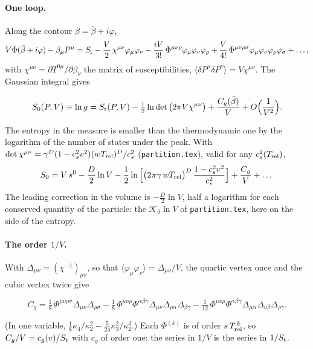 \documentclass[11pt,aps,preprint,nofootinbib,superscriptaddress,tightenlines]{revtex4-2}
\newcommand{\avg}[1]{\langle #1\rangle}
\def\st{\begin{equation}}
\def\stp{\end{equation}}
\let\oldparagraph\paragraph
\renewcommand{\paragraph}{\par\bigskip\oldparagraph}
\begin{document}
\paragraph{One loop.}  Along the contour $\beta=\bar\beta+i\varphi$,
\st
V\Phi(\bar\beta+i\varphi)-\beta_\mu P^\mu=S_{\rm t}-\frac V2\,\chi^{\mu\nu}\varphi_\mu\varphi_\nu
-\frac{iV}{3!}\,\Phi^{\mu\nu\rho}\varphi_\mu\varphi_\nu\varphi_\rho+\frac V{4!}\,\Phi^{\mu\nu\rho\sigma}\varphi_\mu\varphi_\nu\varphi_\rho\varphi_\sigma+\dots,
\stp
with $\chi^{\mu\nu}=\partial T^{0\mu}/\partial\beta_\nu$ the matrix of susceptibilities, $\avg{\delta P^\mu\delta P^\nu}=V\chi^{\mu\nu}$.  The Gaussian
integral gives
\begin{keyeq}
\st
S_0(P,V)\equiv\ln g=S_{\rm t}(P,V)-\tfrac12\ln\det\big(2\pi V\chi^{\mu\nu}\big)+\frac{C_g(\bar\beta)}V+O\Big(\frac1{V^2}\Big) .
\label{S0saddle}
\stp
\end{keyeq}
The entropy in the measure is smaller than the thermodynamic one by the logarithm of the number of states under the peak.  With
$\det\chi^{\mu\nu}=\gamma^{D}(1-c_s^2v^2)(wT_{\rm rel})^{D}/c_s^2$ (\nolinkurl{partition.tex}), valid for any $c_s^2(T_{\rm rel})$,
\st
S_0=V\,s^0-\frac D2\ln V-\frac12\ln\Big[\big(2\pi\gamma\,wT_{\rm rel}\big)^{D}\,\frac{1-c_s^2v^2}{c_s^2}\Big]+\frac{C_g}V+\dots
\stp
The leading correction in the volume is $-\tfrac D2\ln V$, half a logarithm for each conserved quantity of the particle: the $\mathcal K_0\ln V$ of
\nolinkurl{partition.tex}, here on the side of the entropy.

\paragraph{The order $1/V$.}  With $\Delta_{\mu\nu}=(\chi^{-1})_{\mu\nu}$, so that $\avg{\varphi_\mu\varphi_\nu}=\Delta_{\mu\nu}/V$, the quartic
vertex once and the cubic vertex twice give
\begin{keyeq}
\st
C_g=\tfrac18\,\Phi^{\mu\nu\rho\sigma}\Delta_{\mu\nu}\Delta_{\rho\sigma}
-\tfrac18\,\Phi^{\mu\nu\rho}\Phi^{\alpha\beta\gamma}\Delta_{\mu\nu}\Delta_{\rho\alpha}\Delta_{\beta\gamma}
-\tfrac1{12}\,\Phi^{\mu\nu\rho}\Phi^{\alpha\beta\gamma}\Delta_{\mu\alpha}\Delta_{\nu\beta}\Delta_{\rho\gamma} .
\label{Cg}
\stp
\end{keyeq}
(In one variable, $\tfrac18\kappa_4/\kappa_2^2-\tfrac5{24}\kappa_3^2/\kappa_2^3$.)  Each $\Phi^{(k)}$ is of order $s\,T_{\rm rel}^{\,k}$, so
$C_g/V=c_g(v)/S_{\rm t}$ with $c_g$ of order one: the series in $1/V$ is the series in $1/S_{\rm t}$.
\end{document}
